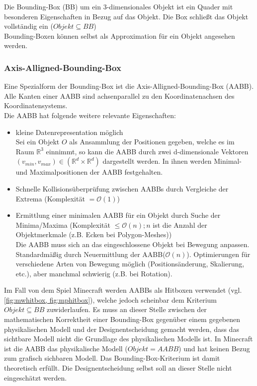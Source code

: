 Die Bounding-Box (BB) um ein 3-dimensionales Objekt ist ein Quader mit besonderen Eigenschaften in Bezug auf das Objekt. Die Box schließt das Objekt vollständig ein ($Objekt \subseteq BB$)\\
Bounding-Boxen können selbst als Approximation für ein Objekt angesehen werden.\\
\subsubsection{Axis-Alligned-Bounding-Box}
Eine Spezialform der Bounding-Box ist die Axis-Alligned-Bounding-Box (AABB). Alle Kanten einer AABB sind achsenparallel zu den Koordinatenachsen des Koordinatensystems.\\
Die AABB hat folgende weitere relevante Eigenschaften:
\begin{itemize}
	\item kleine Datenrepresentation möglich\\
		Sei ein Objekt $O$ als Ansammlung der Positionen gegeben, welche es im Raum $\mathbb{R}^3$ einnimmt, so kann die AABB durch zwei d-dimensionale Vektoren $(v_{min}, v_{max}) \in (\mathbb{R}^{d}\times\mathbb{R}^{d})$ dargestellt werden. In ihnen werden Minimal- und Maximalpositionen der AABB festgehalten.
	\item Schnelle Kollisionsüberprüfung zwischen AABBs durch Vergleiche der Extrema (Komplexität $= \mathcal{O}(1)$)
	\item Ermittlung einer minimalen AABB für ein Objekt durch Suche der Minima/Maxima (Komplexität $\le \mathcal{O}(n); n $ ist die Anzahl der Objektmerkmale (z.B. Ecken bei Polygon-Meshes))\\
		Die AABB muss sich an das eingeschlossene Objekt bei Bewegung anpassen. Standardmäßig durch Neuermittlung der AABB($\mathcal{O}(n)$). Optimierungen für verschiedene Arten von Bewegung möglich (Positionsänderung, Skalierung, etc.), aber manchmal schwierig (z.B. bei Rotation).
\end{itemize}

Im Fall von dem Spiel Minecraft werden AABBs als Hitboxen verwendet (vgl. \ref{fig:mwhitbox, fig:mphitbox}), welche jedoch scheinbar dem Kriterium $Objekt \subseteq BB$ zuwiderlaufen. Es muss an dieser Stelle zwischen der mathematischen Korrektheit einer Bounding-Box gegenüber einem gegebenen physikalischen Modell und der Designentscheidung gemacht werden, dass das sichtbare Modell nicht die Grundlage des physikalischen Modells ist. In Minecraft ist die AABB das physikalische Modell ($Objekt = AABB$) und hat keinen Bezug zum grafisch sichbaren Modell. Das Bounding-Box-Kriterium ist damit theoretisch erfüllt. Die Designentscheidung selbst soll an dieser Stelle nicht eingeschätzt werden.

